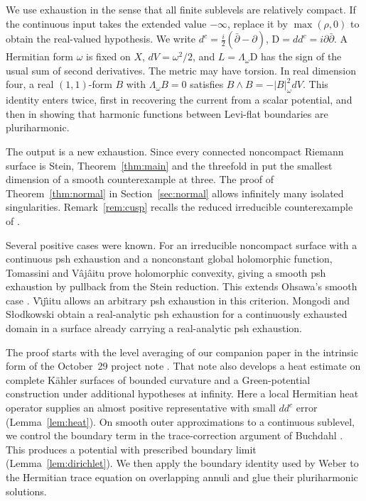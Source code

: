\documentclass[11pt]{amsart}
\theoremstyle{remark}
\numberwithin{equation}{section}
\newcommand{\D}{\mathrm{D}}
\begin{document}
We use exhaustion in the sense that all finite sublevels are relatively
compact. If the continuous input takes the extended value \(-\infty\),
replace it by \(\max(\rho,0)\) to obtain the real-valued hypothesis.
We write \(d^c=\tfrac i2(\bar\partial-\partial)\),
\(\D=dd^c=i\partial\bar\partial\). A Hermitian form \(\omega\) is fixed
on \(X\), \(dV=\omega^2/2\), and \(L=\Lambda_\omega\D\) has the sign of
the usual sum of second derivatives. The metric may have torsion.
In real dimension four, a real \((1,1)\)-form \(B\) with
\(\Lambda_\omega B=0\) satisfies \(B\wedge B=-|B|_\omega^2dV\).
This identity enters twice, first in recovering the current from a scalar
potential, and then in showing that harmonic functions between Levi-flat
boundaries are pluriharmonic.

The output is a new exhaustion. Since every connected noncompact Riemann
surface is Stein, Theorem~\ref{thm:main} and the threefold in \cite[Theorem~1.1]{CX}
put the smallest dimension of a smooth counterexample at three.
The proof of Theorem~\ref{thm:normal} in Section~\ref{sec:normal}
allows infinitely many isolated singularities. Remark~\ref{rem:cusp}
recalls the reduced irreducible counterexample of
\cite[Proposition~5.7]{CX}.

Several positive cases were known. For an irreducible noncompact
surface with a continuous psh exhaustion and a nonconstant global
holomorphic function, Tomassini and V\^aj\^aitu \cite{TV} prove
holomorphic convexity, giving a smooth psh exhaustion by pullback
from the Stein reduction. This extends Ohsawa's smooth case
\cite[Proposition~1.4]{Ohsawa}. V\^{\i}j\^{\i}itu
\cite[Theorem~1.1]{Vij} allows an arbitrary psh exhaustion in this
criterion. Mongodi and S{\l}odkowski \cite[Corollary~4.5]{MS} obtain
a real-analytic psh exhaustion for a continuously exhausted domain
in a surface already carrying a real-analytic psh exhaustion.

The proof starts with the level averaging of our companion paper
\cite[Lemma~5.3]{CX} in the intrinsic form of the October~29 project
note \cite[Proposition~2.1]{Oct}. That note also develops a heat
estimate on complete K\"ahler surfaces of bounded curvature and a
Green-potential construction under additional hypotheses at infinity.
Here a local Hermitian heat operator supplies an almost positive
representative with small $dd^c$ error (Lemma~\ref{lem:heat}).
On smooth outer approximations to a continuous sublevel, we control
the boundary term in the trace-correction argument of Buchdahl
\cite[\S2]{Buchdahl}. This produces a potential with prescribed
boundary limit (Lemma~\ref{lem:dirichlet}). We then apply the
boundary identity used by Weber \cite{Weber} to the Hermitian trace
equation on overlapping annuli and glue their pluriharmonic solutions.
\end{document}
